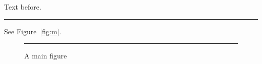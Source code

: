 \documentclass{tufte-handout}
\begin{document}
Text before.
\begin{marginfigure}
\rule{1cm}{1cm}
\caption{A margin figure}
\label{fig:m}
\end{marginfigure}
See Figure~\ref{fig:m}.
\begin{figure}
\rule{1cm}{1cm}
\caption{A main figure}
\end{figure}
\end{document}
